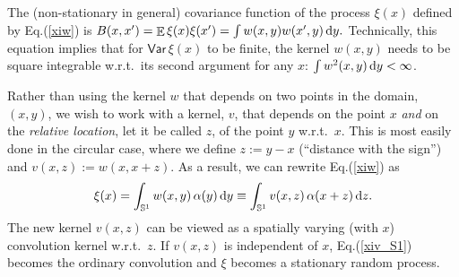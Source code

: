\documentclass[12pt]{article}
\DeclareMathOperator{\Ex}{\mathbb{E}}
\newcommand{\Var}{{\mathsf{Var}}\,}
\renewcommand{\S}{{\mathbb S}}
\renewcommand{\d}{{\rm d}}
\newcommand{\wrt}{w.r.t.\ }
\begin{document}
The (non-stationary in general)
covariance function of the process $\xi(x)$ defined by Eq.(\ref{xiw}) is
$
%
B(x,x')=\Ex\xi(x)\xi(x') = \int w(x, y) w(x', y) \,\d y.
%
$
Technically, this equation implies that for $\Var\xi(x)$ to be finite, the kernel
$w(x, y)$  needs to be square integrable \wrt its second argument for any $x$:
%
\label{inth2}
$\int w^2(x, y) \,\d y < \infty$.
%

Rather than using the kernel $w$ that depends on two points in the domain, $(x,y)$,
we wish to work with a kernel, $v$, that depends on the point $x$ {\em and} on the {\em relative location},
let it be called $z$, 
of the point $y$ \wrt $x$. This is most easily done in the circular case, where we define  
$z:=y-x$  (``distance with the sign'') and  $v(x,z) := w(x,x+z)$.
As a result, we can rewrite Eq.(\ref{xiw}) as
%
\begin {equation}
\label{xiv_S1}
\xi(x) = \int_{\S^1} w(x, y) \,\alpha(y) \,\d y \equiv
         \int_{\S^1} v(x, z) \,\alpha(x+z) \,\d z.
\end {equation}
%
The new kernel $v(x,z)$ can be viewed as a spatially varying (with $x$)
convolution kernel \wrt $z$.
If $v(x,z)$ is independent of $x$, Eq.(\ref{xiv_S1}) becomes the ordinary convolution
and $\xi$ becomes a stationary random process. 
\end{document}
